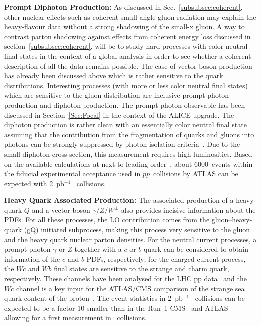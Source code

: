 \documentclass[../report.tex]{subfiles}
\begin{document}
\noindent\textbf{Prompt Diphoton Production:} 
%
As discussed in Sec.~\ref{subsubsec:coherent}, other nuclear effects such
as coherent small angle gluon radiation may explain the heavy-flavour
data without a strong shadowing of the small-x gluon.  A way to
contrast parton shadowing against effects from coherent energy loss discussed in section~\ref{subsubsec:coherent},
will be to study hard processes with color neutral final states in the
context of a global analysis in order to see whether a coherent
description of all the data remains possible. The case of vector boson
production has already been discussed above which is rather sensitive
to the quark distributions.  Interesting processes (with more or less
color neutral final states) which are sensitive to the gluon
distribution are inclusive prompt photon production and diphoton
production. The prompt photon observable has been discussed in Section~\ref{Sec:Focal} in the context of the ALICE upgrade.  The diphoton production is rather clean with an
essentially color neutral final state assuming that the contribution
from the fragmentation of quarks and gluons into photons can be
strongly suppressed by photon isolation criteria~\cite{ATLAS:2017ojy,Acharya:2018dqe}.
Due to the small
diphoton cross section, this measurement requires high luminosities. Based on the available calculations at next-to-leading order~\cite{Catani:2018krb,Boussaha:2018egy}, about 6000~events within the fiducial experimental acceptance used in $pp$~collisions by ATLAS can be expected with 2~pb$^{-1}$ \pPb~collisions.


\noindent\textbf{Heavy Quark Associated Production:}
%
The associated production of a heavy quark $Q$ and a vector boson $\gamma/Z/W^\pm$ 
also provides incisive information  about the PDFs.  
%
For all these processes, the LO contribution   comes from the gluon--heavy-quark (gQ) initiated
subprocess, making this process very sensitive to the gluon and the heavy quark nuclear parton
densities.
%
For the neutral current processes, a prompt photon $\gamma$ or $Z$ together with a
$c$ or $b$ quark can be considered to obtain information of the $c$ and $b$ PDFs, respectively; 
for the charged current process, the  $Wc$ and $Wb$ final states are sensitive to the strange and charm quark, respectively. 
%
These channels have been analysed for the LHC pp data~\cite{Dunford:2013lya,Beauchemin:2013cra,Ciaccio:2013rka,Candelise:2015gxa,Chatrchyan:2013uja,Aad:2014xca}
and the $Wc$ channel is a key input for the ATLAS/CMS comparison of the strange sea quark content of the proton~\cite{Cooper-Sarkar:2018ufj}.
The event statistics in 2~pb$^{-1}$ \pPb~collisions can be expected to be a factor 10 smaller than in the Run~1 CMS~\cite{Chatrchyan:2013uja} and ATLAS~\cite{Aad:2014xca} allowing for a first measurement in \pPb~collisions. 
\end{document}
